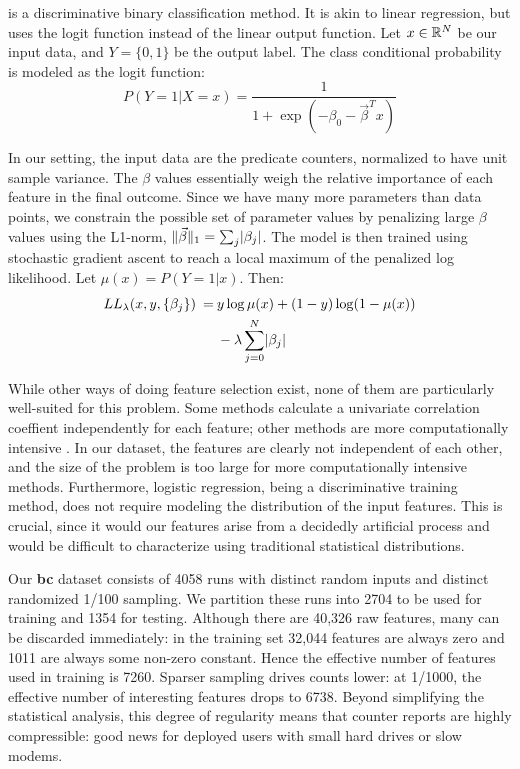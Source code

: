  \cite{Hastie01} is a discriminative
binary classification method.  It is akin to linear regression, but
uses the logit function instead of the linear output function.  Let $x
\in \mathbb{R}^N$ be our input data, and $Y = \{0, 1\}$ be the output
label.  The class conditional probability is modeled as the logit
function:
\begin{equation*}
  P(Y = 1 | X = x) = \frac{1}{ 1 + \exp(- \beta_0 - \vec\beta^T x) }
\end{equation*}

In our setting, the input data are the predicate counters, normalized
to have unit sample variance.  The $\beta$ values essentially weigh
the relative importance of each feature in the final outcome.  Since
we have many more parameters than data points, we constrain the
possible set of parameter values by penalizing large $\beta$ values
using the L1-norm, $\lVert\vec\beta\rVert_1 = \sum_j \lvert\beta_j\rvert$.  The
model is then trained using stochastic gradient ascent to reach a
local maximum of the penalized log likelihood.  Let $\mu(x) = P(Y = 1
| x)$.  Then:
\begin{equation*}
  \begin{split}
    LL_\lambda (x, y, \{\beta_j\}) \:=\:
    & y \log \mu(x) + (1 - y) \log (1 - \mu(x)) \\
    & - \lambda \sum_{j = 0}^N \lvert\beta_j\rvert
  \end{split}
\end{equation*}

While other ways of doing feature selection exist, none of them are
particularly well-suited for this problem.  Some methods
\cite{Golub:MCC:1999,Tibshirani2002} calculate a univariate
correlation coeffient independently for each feature; other methods
are more computationally intensive \cite{Breiman:RFRF:1999,Hastie01}.
In our dataset, the features are clearly not independent of each
other, and the size of the problem is too large for more
computationally intensive methods.  Furthermore, logistic regression,
being a discriminative training method, does not require modeling the
distribution of the input features.  This is crucial, since it would
our features arise from a decidedly artificial process and would be
difficult to characterize using traditional statistical distributions.

Our \textbf{bc} dataset consists of 4058 runs with distinct random
inputs and distinct randomized 1/100 sampling.  We partition these
runs into 2704 to be used for training and 1354 for testing.  Although
there are 40,326 raw features, many can be discarded immediately: in
the training set 32,044 features are always zero and 1011 are always
some non-zero constant.  Hence the effective number of features used
in training is 7260.  Sparser sampling drives counts lower: at 1/1000,
the effective number of interesting features drops to 6738.  Beyond
simplifying the statistical analysis, this degree of regularity means
that counter reports are highly compressible: good news for deployed
users with small hard drives or slow modems.

